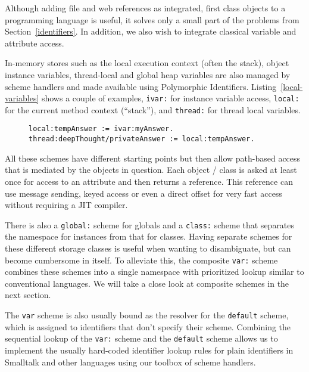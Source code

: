 \documentclass[preprint,authoryear]{llncs}
\begin{document}
Although adding file and web references as integrated, first class objects to a programming
language is useful, it solves only a small part of the problems from Section~\ref{identifiers}.
In addition, we also wish to integrate classical variable and attribute access.

In-memory stores such as the local execution context (often the stack), object instance
variables, thread-local and global heap variables are also managed by scheme handlers
and made available using Polymorphic Identifiers.  Listing~\ref{local-variables} shows
a couple of examples, {\tt ivar:} for instance variable access, {\tt local:} for the current
method context (``stack''), and {\tt thread:} for thread local variables.

\begin{figure}[htbp]
\begin{lstlisting}[style=numbers,label=local-variables,caption=Different memory variables.]
local:tempAnswer := ivar:myAnswer.
thread:deepThought/privateAnswer := local:tempAnswer.
\end{lstlisting}
\end{figure}

All these schemes have different starting points but then allow path-based access
that is mediated by the objects in question.   Each object / class is asked at least
once for access to an attribute and then returns a reference.   This reference can
use message sending, keyed access or even a direct offset for very fast
access without requiring a JIT compiler.

There is also a {\tt global:} scheme for globals and a {\tt class:} scheme that separates
the namespace for instances from that for classes.  Having separate schemes for
these different storage classes is useful when wanting to disambiguate,
but can become cumbersome in itself.  To alleviate this, the composite
{\tt var:} scheme combines these schemes into a single namespace
with prioritized lookup similar to conventional languages.  We will take
a close look at composite schemes in the next section.  

The {\tt var} scheme is also usually bound as the resolver for the {\tt default}
scheme, which is assigned to identifiers that don't specify their scheme.
Combining the sequential lookup of the {\tt var:} scheme and the {\tt default}
scheme allows us to implement the usually hard-coded identifier lookup
rules for plain identifiers in Smalltalk and other languages using
our toolbox of scheme handlers.
\end{document}
